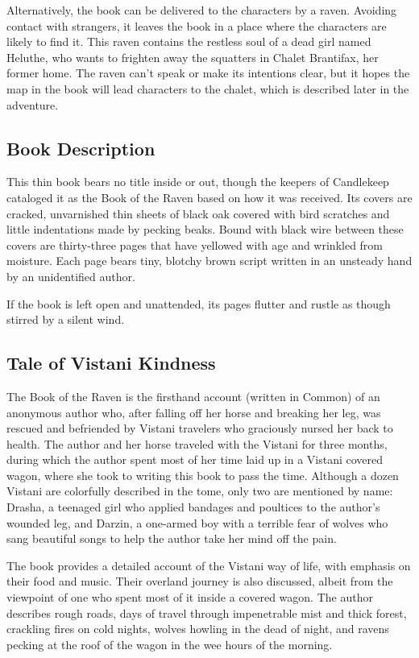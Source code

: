 \documentclass[10pt,a4paper,twoside,bg=print,twocolumn,openany,nodeprecatedcode]{dndbook}
\begin{document}
Alternatively, the book can be delivered to the characters by a raven. Avoiding contact with strangers, it leaves the book in a place where the characters are likely to find it. This raven contains the restless soul of a dead girl named Heluthe, who wants to frighten away the squatters in Chalet Brantifax, her former home. The raven can't speak or make its intentions clear, but it hopes the map in the book will lead characters to the chalet, which is described later in the adventure.

\subsection{Book Description}
This thin book bears no title inside or out, though the keepers of Candlekeep cataloged it as the Book of the Raven based on how it was received. Its covers are cracked, unvarnished thin sheets of black oak covered with bird scratches and little indentations made by pecking beaks. Bound with black wire between these covers are thirty-three pages that have yellowed with age and wrinkled from moisture. Each page bears tiny, blotchy brown script written in an unsteady hand by an unidentified author.

If the book is left open and unattended, its pages flutter and rustle as though stirred by a silent wind.

\subsection{Tale of Vistani Kindness}
The Book of the Raven is the firsthand account (written in Common) of an anonymous author who, after falling off her horse and breaking her leg, was rescued and befriended by Vistani travelers who graciously nursed her back to health. The author and her horse traveled with the Vistani for three months, during which the author spent most of her time laid up in a Vistani covered wagon, where she took to writing this book to pass the time. Although a dozen Vistani are colorfully described in the tome, only two are mentioned by name: Drasha, a teenaged girl who applied bandages and poultices to the author's wounded leg, and Darzin, a one-armed boy with a terrible fear of wolves who sang beautiful songs to help the author take her mind off the pain.

The book provides a detailed account of the Vistani way of life, with emphasis on their food and music. Their overland journey is also discussed, albeit from the viewpoint of one who spent most of it inside a covered wagon. The author describes rough roads, days of travel through impenetrable mist and thick forest, crackling fires on cold nights, wolves howling in the dead of night, and ravens pecking at the roof of the wagon in the wee hours of the morning.
\end{document}

